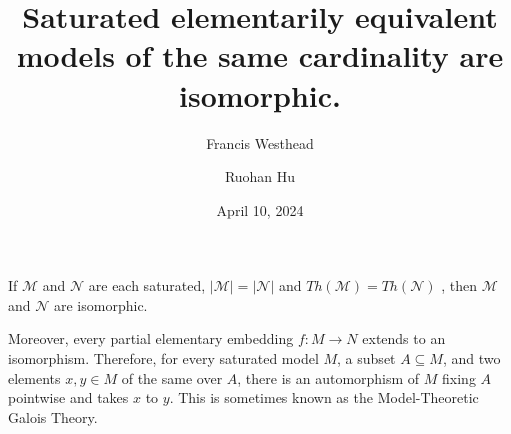 \documentclass[a4paper]{article}
\title{Saturated elementarily equivalent models of the same cardinality are isomorphic.}
\date{April 10, 2024}
\author{Francis Westhead \and Ruohan Hu}
\begin{document}
\maketitle
\par{
    If \(\mathcal {M}\) and \(\mathcal {N}\) are each saturated, \(| \mathcal {M}|=| \mathcal {N}|\) and \(Th( \mathcal {M})=Th( \mathcal {N})\)
, then \(\mathcal {M}\) and \(\mathcal {N}\) are isomorphic.
}\par{
    Moreover, every partial elementary embedding \(f:M \to  N\) extends to an isomorphism. 
    Therefore, for every saturated model \(M\), a subset \(A \subseteq  M\), and two elements \(x,y \in  M\) of the same  over \(A\), there is an automorphism of \(M\) fixing \(A\) pointwise and takes \(x\) to \(y\).
    This is sometimes known as the Model-Theoretic Galois Theory.
}
\printbibliography
\end{document}
